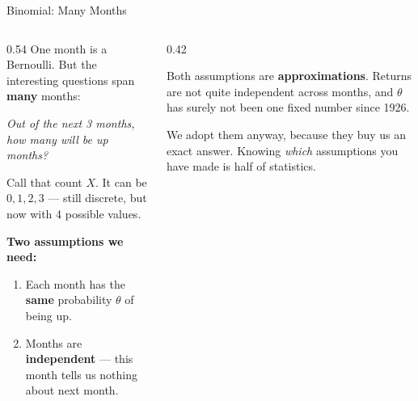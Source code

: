 \documentclass[9pt,english,aspectratio=169]{beamer}
\begin{document}
\begin{frame}[label=appbinomial]{Binomial: Many Months}

  \begin{columns}[T]
    \begin{column}{0.54\textwidth}
      One month is a Bernoulli. But the interesting questions span \textbf{many}
      months:

      \vspace{0.6em}
      \textit{Out of the next 3 months, how many will be up months?}

      \vspace{0.8em}
      Call that count $X$. It can be $0, 1, 2, 3$ --- still discrete,
      but now with 4 possible values.

      \vspace{0.8em}
      \begin{methodbox}
        \textbf{Two assumptions we need:}
        \begin{enumerate}
          \item Each month has the \textbf{same} probability $\theta$ of being up.
          \item Months are \textbf{independent} --- this month tells us nothing
                about next month.
        \end{enumerate}
      \end{methodbox}
    \end{column}
    \begin{column}{0.42\textwidth}
      \vspace{1.5em}
      \begin{insightbox}
        Both assumptions are \textbf{approximations}. Returns are not quite
        independent across months, and $\theta$ has surely not been one fixed
        number since 1926.

        \vspace{0.4em}
        We adopt them anyway, because they buy us an exact answer. Knowing
        \emph{which} assumptions you have made is half of statistics.
      \end{insightbox}
    \end{column}
  \end{columns}

\end{frame}
\end{document}
